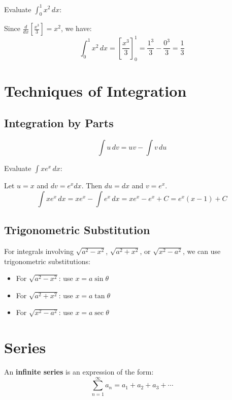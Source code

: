 \begin{example}
Evaluate $\int_0^1 x^2 \, dx$:

Since $\frac{d}{dx}\left[\frac{x^3}{3}\right] = x^2$, we have:
\[\int_0^1 x^2 \, dx = \left[\frac{x^3}{3}\right]_0^1 = \frac{1^3}{3} - \frac{0^3}{3} = \frac{1}{3}\]
\end{example}

\section{Techniques of Integration}

\subsection{Integration by Parts}

\begin{theorem}
\[\int u \, dv = uv - \int v \, du\]
\end{theorem}

\begin{example}
Evaluate $\int x e^x \, dx$:

Let $u = x$ and $dv = e^x dx$. Then $du = dx$ and $v = e^x$.
\[\int x e^x \, dx = x e^x - \int e^x \, dx = x e^x - e^x + C = e^x(x - 1) + C\]
\end{example}

\subsection{Trigonometric Substitution}

For integrals involving $\sqrt{a^2 - x^2}$, $\sqrt{a^2 + x^2}$, or $\sqrt{x^2 - a^2}$, we can use trigonometric substitutions:

\begin{itemize}
    \item For $\sqrt{a^2 - x^2}$: use $x = a \sin \theta$
    \item For $\sqrt{a^2 + x^2}$: use $x = a \tan \theta$  
    \item For $\sqrt{x^2 - a^2}$: use $x = a \sec \theta$
\end{itemize}

\section{Series}

\begin{definition}
An \textbf{infinite series} is an expression of the form:
\[\sum_{n=1}^{\infty} a_n = a_1 + a_2 + a_3 + \cdots\]
\end{definition}

